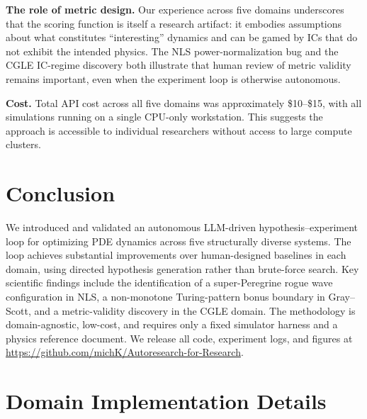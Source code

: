 \documentclass[11pt]{article}
\begin{document}
\noindent\textbf{The role of metric design.}
Our experience across five domains underscores that the scoring function
is itself a research artifact: it embodies assumptions about what constitutes
``interesting'' dynamics and can be gamed by ICs that do not exhibit the
intended physics.
The NLS power-normalization bug and the CGLE IC-regime discovery both
illustrate that human review of metric validity remains important,
even when the experiment loop is otherwise autonomous.

\noindent\textbf{Cost.}
Total API cost across all five domains was approximately \$10--\$15,
with all simulations running on a single CPU-only workstation.
This suggests the approach is accessible to individual researchers
without access to large compute clusters.

\section{Conclusion}
\label{sec:conclusion}

We introduced and validated an autonomous LLM-driven hypothesis--experiment
loop for optimizing PDE dynamics across five structurally diverse systems.
The loop achieves substantial improvements over human-designed baselines
in each domain, using directed hypothesis generation rather than brute-force
search.
Key scientific findings include the identification of a super-Peregrine
rogue wave configuration in NLS, a non-monotone Turing-pattern bonus
boundary in Gray--Scott, and a metric-validity discovery in the CGLE
domain.
The methodology is domain-agnostic, low-cost, and requires only a fixed
simulator harness and a physics reference document.
We release all code, experiment logs, and figures at
\url{https://github.com/michK/Autoresearch-for-Research}.




\appendix

\section{Domain Implementation Details}
\label{app:domains}
\end{document}
